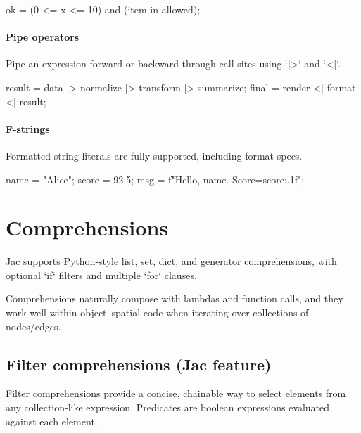 \begin{jacblock}
ok = (0 <= x <= 10) and (item in allowed);
\end{jacblock}

\paragraph{Pipe operators}

Pipe an expression forward or backward through call sites using `|>` and `<|`.

\begin{jacblock}
result = data |> normalize |> transform |> summarize;
final  = render <| format <| result;
\end{jacblock}

\paragraph{F-strings}

Formatted string literals are fully supported, including format specs.

\begin{jacblock}
name = "Alice"; score = 92.5;
msg = f"Hello, {name}. Score={score:.1f}";
\end{jacblock}

\section{Comprehensions}

Jac supports Python-style list, set, dict, and generator comprehensions, with optional `if` filters and multiple `for` clauses.


Comprehensions naturally compose with lambdas and function calls, and they work well within object–spatial code when iterating over collections of nodes/edges.

\subsection{Filter comprehensions (Jac feature)}

Filter comprehensions provide a concise, chainable way to select elements from any collection-like expression. Predicates are boolean expressions evaluated against each element.

